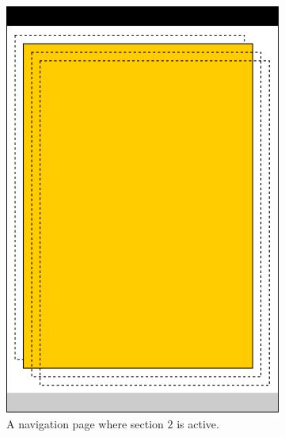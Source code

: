\documentclass[a4paper,oneside]{book}
\begin{document}
\begin{figure}[ht]
\begin{subfigure}[t]{0.22\textwidth}
        \includegraphics[width=\textwidth]{nav_page_url.png}
        \caption{A navigation page where section $2$ is active.}
        \label{fig.nav_page_url}
    \end{subfigure}
    ~
    \begin{subfigure}[t]{0.22\textwidth}

\end{subfigure}
\end{figure}
\end{document}
